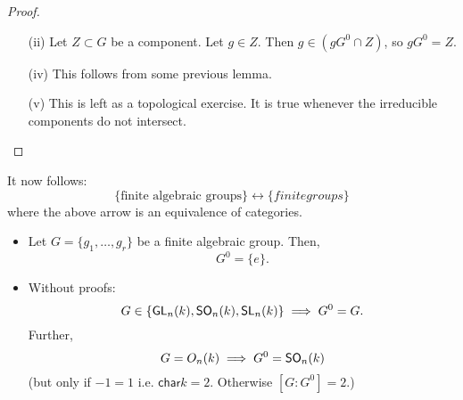 \begin{proof}
\begin{enumerate}
	\textbf{Why is $G^0$ a normal?} If $g \in G$, then $gG^0g\i$ is a component that contains $e$, therefore $G^0 = gG^0g\i$.
	
	
	(Alternative proof that $m(G^0 \times G^0) = G^0$: Consider
	\begin{itemize}
		\item any continuous image of an irreducible set is irreducible.
	\item	the closure of any irreducible set is irreducible.
	\end{itemize}
	Ergo $\overline{m(G^0\times G^0)}$ is a closed irreducible set containing $e$. Ergo, $\overline{m(G^0\times G^0)} = G^0$).
	
	\item[(ii)] Let $Z \subset G$ be a component. Let $g \in Z$. Then $g \in (gG^0 \cap Z) $, so $gG^0 = Z$.
	\item[(iv)] This follows from some previous lemma.
	\item[(v)] This is left as a topological exercise. It is true whenever the irreducible components do not intersect.
	\end{enumerate}
\end{proof}

It now follows:
\[ \{ \text{finite algebraic groups}\} \longleftrightarrow \{ finite groups \} \]
where the above arrow is an equivalence of categories.

\begin{example}
	\begin{itemize}
		\item Let $G = \{g_1, \ldots, g_r\}$ be a finite algebraic group. Then,
		\[ G^0 = \{e\}.\]
		\item Without proofs:
		\[ G \in \{\textsf{GL}_n(k), \textsf{SO}_n(k),\textsf{SL}_n(k)\} \implies G^0 = G. \]
		Further,
		\[G = O_n(k) \implies G^0 = \textsf{SO}_n(k)\]
		(but only if $-1 = 1$ i.e. $\textsf{char} k = 2$. Otherwise $[G:G^0] = 2$.) 
	\end{itemize}
\end{example}

